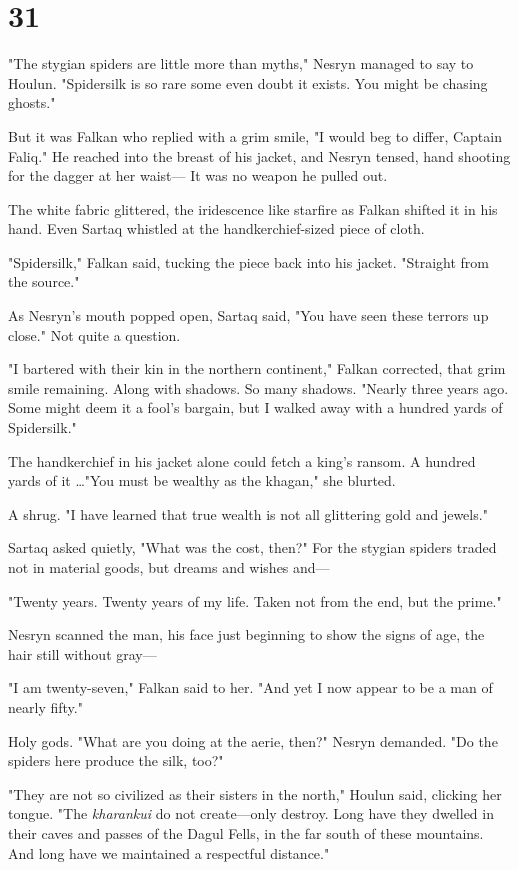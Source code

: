 
\chapter{31}

"The stygian spiders are little more than myths," Nesryn managed to say to Houlun.
"Spidersilk is so rare some even doubt it exists.
You might be chasing ghosts."

But it was Falkan who replied with a grim smile, "I would beg to differ, Captain Faliq."
He reached into the breast of his jacket, and Nesryn tensed, hand shooting for the dagger at her waist--- It was no weapon he pulled out.

The white fabric glittered, the iridescence like starfire as Falkan shifted it in his hand.
Even Sartaq whistled at the handkerchief-sized piece of cloth.

"Spidersilk," Falkan said, tucking the piece back into his jacket.
"Straight from the source."

As Nesryn's mouth popped open, Sartaq said, "You have seen these terrors up close."
Not quite a question.

"I bartered with their kin in the northern continent," Falkan corrected, that grim smile remaining.
Along with shadows.
So many shadows.
"Nearly three years ago.
Some might deem it a fool's bargain, but I walked away with a hundred yards of Spidersilk."

The handkerchief in his jacket alone could fetch a king's ransom.
A hundred yards of it \ldots"You must be wealthy as the khagan," she blurted.

A shrug.
"I have learned that true wealth is not all glittering gold and jewels."

Sartaq asked quietly, "What was the cost, then?"
For the stygian spiders traded not in material goods, but dreams and wishes and---

"Twenty years.
Twenty years of my life.
Taken not from the end, but the prime."

Nesryn scanned the man, his face just beginning to show the signs of age, the hair still without gray---

"I am twenty-seven," Falkan said to her.
"And yet I now appear to be a man of nearly fifty."

Holy gods.
"What are you doing at the aerie, then?"
Nesryn demanded.
"Do the spiders here produce the silk, too?"

"They are not so civilized as their sisters in the north," Houlun said, clicking her tongue.
"The \emph{kharankui} do not create---only destroy.
Long have they dwelled in their caves and passes of the Dagul Fells, in the far south of these mountains.
And long have we maintained a respectful distance."

